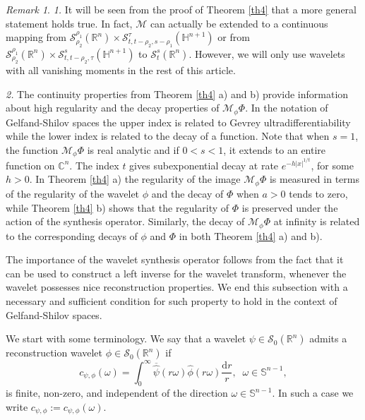 \documentclass[reqno,12pt]{amsart}
\theoremstyle{plain}
\theoremstyle{definition}
\theoremstyle{remark}
\newtheorem{remark}{Remark}
\begin{document}
\begin{remark} \label{remark C and S}
{\em 1.} It will be seen from the proof of Theorem \ref{th4} that a more general statement holds true. In fact, ${\mathcal M}$
can actually be extended to a continuous mapping from
$ {\mathcal S}^{\rho_1} _ {\rho_2}
(\mathbb{R}^n) \times {\mathcal S}^{\tau}_{t, t - \rho_2, s - \rho_1} (\mathbb{H}^{n+1})$
or from
$ {\mathcal S}^{\rho_1} _ {\rho_2} (\mathbb{R}^n) \times {\mathcal S}^{s}_{t,t - \rho_2, \tau}
(\mathbb{H}^{n+1}) $ to $ {\mathcal S}^{s}_{t} (\mathbb{R}^n) $.
However, we will only use wavelets with all vanishing moments in the rest of this article.

\par

{\em 2.}
The continuity properties from Theorem \ref{th4} a) and  b) provide
information about high regularity and the decay properties of $ \mathcal{M}_{\phi}
\Phi $. In the notation of Gelfand-Shilov spaces the
upper index is related to Gevrey ultradifferentiability while the lower index is
related to the decay of a function. Note that when $s=1$, the function $ \mathcal{M}_{\phi}
\Phi $ is real analytic and if $0<s<1$, it extends to an entire function on $\mathbb{C}^{n}$. The index $t$ gives subexponential decay at rate $e^{-h|x|^{1/t}}$, for some $h>0$. In Theorem \ref{th4} a) the
regularity of the image $ \mathcal{M}_{\phi} \Phi $ is measured in
terms of the regularity of the wavelet $\phi $ and the decay of $ \Phi $ when $a>0 $ tends to zero, while Theorem \ref{th4} b) shows that  the regularity of $ \Phi $ is
preserved under the action of the synthesis operator. Similarly, the
decay of $ \mathcal{M}_{\phi} \Phi $ at infinity is related to the
corresponding decays of $\phi $ and $\Phi $ in both Theorem
\ref{th4} a) and b).
\end{remark}

\par

The importance of the wavelet synthesis operator follows from the
fact that it can be used to construct a left inverse for the wavelet
transform, whenever the wavelet possesses nice reconstruction
properties. We end this subsection with a necessary and sufficient condition for such
property to hold in the context of Gelfand-Shilov spaces.

We start with some terminology. We say that a wavelet $ \psi \in {\mathcal S}_{0}
(\mathbb{R}^n)$ admits a reconstruction wavelet $ \phi \in
{\mathcal S}_0 (\mathbb{R}^n) $ if
$$ c_{\psi,\phi}(\omega)= \int^{\infty}_{0}
\overline{\hat{\psi}}(r\omega) \hat{\phi}(r\omega)
\frac{\mathrm{d}r}{r}, \;\;
\omega\in\mathbb{S}^{n-1}, $$
is finite, non-zero, and independent of the direction  $\omega\in\mathbb{S}^{n-1}$. In such a case we write $c_{\psi,\phi}:=c_{\psi,\phi}(\omega)$.
\end{document}
